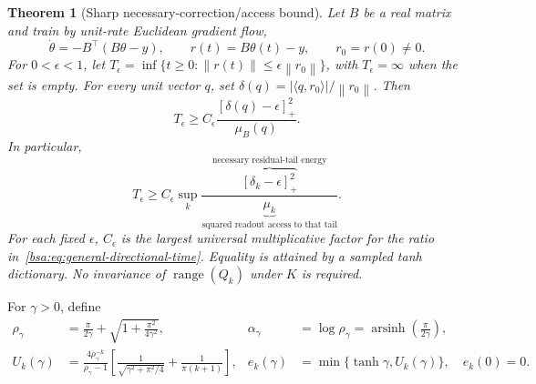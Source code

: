 \documentclass[11pt,letterpaper]{article}
\newcommand{\bsaNorm}[1]{\left\lVert #1\right\rVert}
\newcommand{\bsaPos}[1]{\left[#1\right]_+}
\DeclareMathOperator{\bsaArsinh}{arsinh}
\DeclareMathOperator{\bsaRange}{range}
\newtheorem{bsaTheorem}{Theorem}
\theoremstyle{remark}
\theoremstyle{plain}
\begin{document}
\begin{bsaTheorem}[Sharp necessary-correction/access bound]
\label{bsa:thm:time}
Let $B$ be a real matrix and train by unit-rate Euclidean gradient flow,
\begin{equation}
 \dot\theta=-B^\top(B\theta-y),\qquad
 r(t)=B\theta(t)-y,\qquad r_0=r(0)\ne0.
 \label{bsa:eq:gf}
\end{equation}
For $0<\epsilon<1$, let
$T_\epsilon=\inf\{t\ge0:\bsaNorm{r(t)}\le\epsilon\bsaNorm{r_0}\}$,
with $T_\epsilon=\infty$ when the set is empty. For every unit vector $q$, set
$\delta(q)=|\langle q,r_0\rangle|/\bsaNorm{r_0}$. Then
\begin{equation}
 T_\epsilon\ge C_\epsilon
 \frac{\bsaPos{\delta(q)-\epsilon}^2}{\mu_B(q)}.
 \label{bsa:eq:general-directional-time}
\end{equation}
In particular,
\begin{equation}
 \boxed{T_\epsilon\ge C_\epsilon\sup_k
 \frac{\overbrace{\bsaPos{\delta_k-\epsilon}^2}^{\text{necessary residual-tail energy}}}
 {\underbrace{\mu_k}_{\text{squared readout access to that tail}}}.}
 \label{bsa:eq:tail-time}
\end{equation}
For each fixed $\epsilon$, $C_\epsilon$ is the largest universal multiplicative factor for the ratio in~\eqref{bsa:eq:general-directional-time}. Equality is attained by a sampled tanh dictionary. No invariance of $\bsaRange(Q_k)$ under $K$ is required.
\end{bsaTheorem}

For $\gamma>0$, define
\begin{align}
 \rho_\gamma&=\frac{\pi}{2\gamma}+\sqrt{1+\frac{\pi^2}{4\gamma^2}},
 &\alpha_\gamma&=\log\rho_\gamma=\bsaArsinh\!\left(\frac{\pi}{2\gamma}\right),
 \label{bsa:eq:pole-rate}\\
 U_k(\gamma)&=\frac{4\rho_\gamma^{-k}}{\rho_\gamma-1}
 \left[\frac1{\sqrt{\gamma^2+\pi^2/4}}+\frac1{\pi(k+1)}\right],
 &e_k(\gamma)&=\min\{\tanh\gamma,U_k(\gamma)\},\quad e_k(0)=0.
 \label{bsa:eq:explicit-envelope}
\end{align}
\end{document}
